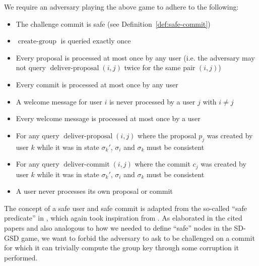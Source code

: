\begin{definition}
	We require an adversary playing the above game to adhere to the following:
	\begin{itemize}
		\item The challenge commit is safe (see Definition~\vref{def:safe-commit}) 
		\item $\operatorname{create-group}$ is queried exactly once 
		\item Every proposal is processed at most once by any user (i.e. the adversary may not query $\operatorname{deliver-proposal}(i, j)$ twice for the same pair $(i, j)$)
		\item Every commit is processed at most once by any user
		\item A welcome message for user $i$ is never processed by a user $j$ with $i \neq j$
		\item Every welcome message is processed at most once by a user
		\item For any query $\operatorname{deliver-proposal}(i, j)$ where the proposal $p_j$ was created by user $k$ while it was in state $\sigma_k'$, $\sigma_i$ and $\sigma_k$ must be consistent
		\item For any query $\operatorname{deliver-commit}(i, j)$ where the commit $c_j$ was created by user $k$ while it was in state $\sigma_k'$, $\sigma_i$ and $\sigma_k$ must be consistent
		\item A user never processes its own proposal or commit
	\end{itemize}
\end{definition}

The concept of a safe user and safe commit is adapted from the so-called ``safe predicate'' in \cite{ttkem}, which again took inspiration from \cite{rtreekem}. As elaborated in the cited papers and also analogous to how we needed to define ``safe'' nodes in the SD-GSD game, we want to forbid the adversary to ask to be challenged on a commit for which it can trivially compute the group key through some corruption it performed.

